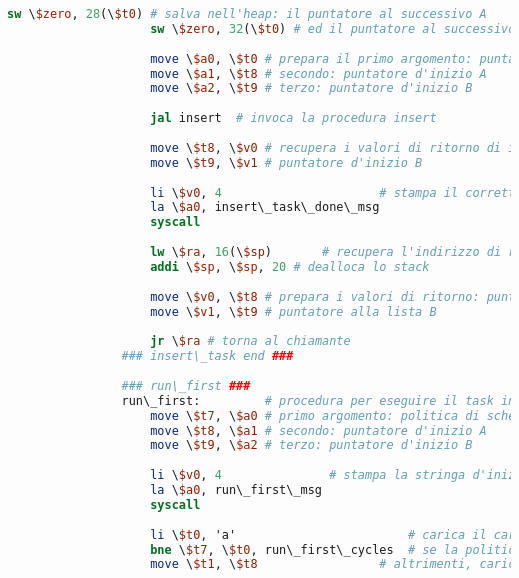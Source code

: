\begin{center}
\begin{lstlisting}[language=mips, gobble=14, stepnumber=1]
                    sw \$zero, 28(\$t0)	# salva nell'heap: il puntatore al successivo A
                    sw \$zero, 32(\$t0)	# ed il puntatore al successivo B
                    
                    move \$a0, \$t0	# prepara il primo argomento: puntatore al task appena creato (da inserire)
                    move \$a1, \$t8	# secondo: puntatore d'inizio A
                    move \$a2, \$t9	# terzo: puntatore d'inizio B
                    
                    jal insert	# invoca la procedura insert
                    
                    move \$t8, \$v0	# recupera i valori di ritorno di insert: puntatore d'inizio A
                    move \$t9, \$v1	# puntatore d'inizio B
                
                    li \$v0, 4						# stampa il corretto inserimento del task
                    la \$a0, insert\_task\_done\_msg
                    syscall
                    
                    lw \$ra, 16(\$sp)		# recupera l'indirizzo di ritorno al chiamante
                    addi \$sp, \$sp, 20	# dealloca lo stack
                    
                    move \$v0, \$t8	# prepara i valori di ritorno: puntatore alla lista A
                    move \$v1, \$t9	# puntatore alla lista B
                    
                    jr \$ra	# torna al chiamante
                ### insert\_task end ###
                
                ### run\_first ###
                run\_first:			# procedura per eseguire il task in testa alla coda
                    move \$t7, \$a0	# primo argomento: politica di scheduling
                    move \$t8, \$a1	# secondo: puntatore d'inizio A
                    move \$t9, \$a2	# terzo: puntatore d'inizio B
                
                    li \$v0, 4               # stampa la stringa d'inizio dell'esecuzione del primo task
                    la \$a0, run\_first\_msg
                    syscall
                    
                    li \$t0, 'a'						# carica il carattere 'a'
                    bne \$t7, \$t0, run\_first\_cycles	# se la politica di scheduling non è A,  passa all'inizializzazione per la politica B
                    move \$t1, \$t8					# altrimenti, carica il puntatore d'inizio di A
                    

\end{lstlisting}
\end{center}
